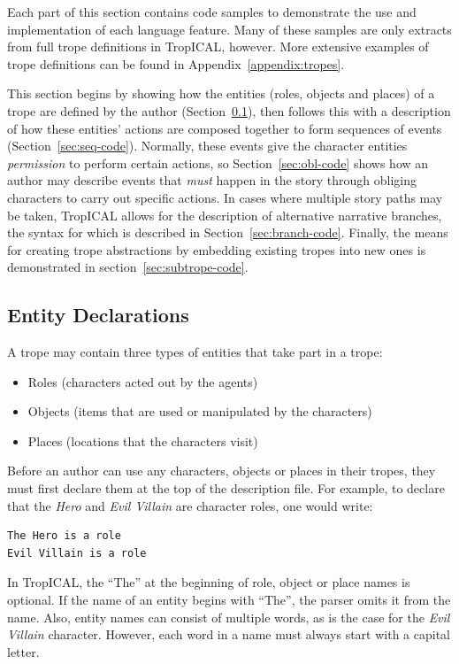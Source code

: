 \documentclass[11pt]{report}
\begin{document}
Each part of this section contains code samples to demonstrate the use and
implementation of each language feature. Many of these samples are only extracts from
full trope definitions in TropICAL, however. More extensive examples of trope
definitions can be found in Appendix~\ref{appendix:tropes}.

This section begins by showing how the entities (roles, objects and places) of a
trope are defined by the author (Section~\ref{sec:dec-code}), then follows this with a description of how
these entities' actions are composed together to form sequences of events (Section~\ref{sec:seq-code}).
Normally, these events give the character entities \emph{permission} to perform
certain actions, so Section~\ref{sec:obl-code} shows how an author may
describe events that \emph{must} happen in the story through obliging characters
to carry out specific actions.
In cases where multiple story paths may be taken, TropICAL allows for the
description of alternative narrative branches, the syntax for which is described
in Section~\ref{sec:branch-code}. Finally, the means for creating trope
abstractions by embedding existing tropes into new ones is demonstrated in
section~\ref{sec:subtrope-code}.

\subsection{Entity Declarations}
\label{sec:dec-code}
A trope may contain three types of entities that take part in a trope:

\begin{itemize}
  \item Roles (characters acted out by the agents)
  \item Objects (items that are used or manipulated by the characters)
  \item Places (locations that the characters visit)
\end{itemize}

Before an author can use any characters, objects or places in their tropes, they
must first declare them at the top of the description file. For example, to declare
that the \emph{Hero} and \emph{Evil Villain} are character roles, one would write:

\begin{lstlisting}[label={lst:dec-roles}, caption={Role declarations}]
The Hero is a role
Evil Villain is a role
\end{lstlisting}

In TropICAL, the ``The'' at the beginning of role, object or place names is
optional. If the name of an entity begins with ``The'', the parser
omits it from the name. Also, entity names can consist of multiple words, as is
the case for the \emph{Evil Villain} character. However, each word in a name must
always start with a capital letter.
\end{document}
